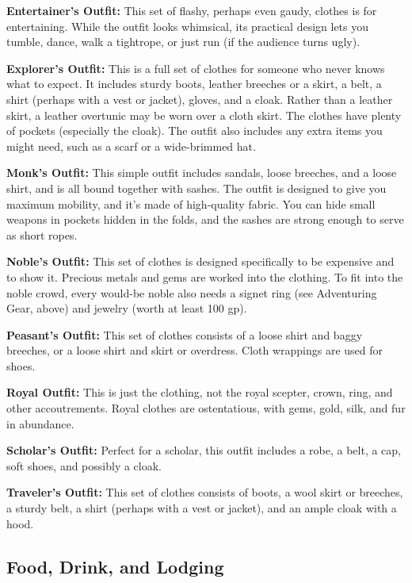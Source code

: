 \textbf{Entertainer's Outfit:} This set of flashy, perhaps even gaudy, clothes 
is for entertaining. While the outfit looks whimsical, its practical design lets 
you tumble, dance, walk a tightrope, or just run (if the audience turns ugly).

\textbf{Explorer's Outfit:} This is a full set of clothes for someone who never 
knows what to expect. It includes sturdy boots, leather breeches or a skirt, a 
belt, a shirt (perhaps with a vest or jacket), gloves, and a cloak. Rather than 
a leather skirt, a leather overtunic may be worn over a cloth skirt. The clothes 
have plenty of pockets (especially the cloak). The outfit also includes any extra 
items you might need, such as a scarf or a wide-brimmed hat.

\textbf{Monk's Outfit:} This simple outfit includes sandals, loose breeches, and 
a loose shirt, and is all bound together with sashes. The outfit is designed to 
give you maximum mobility, and it's made of high-quality fabric. You can hide small 
weapons in pockets hidden in the folds, and the sashes are strong enough to serve 
as short ropes.

\textbf{Noble's Outfit:} This set of clothes is designed specifically to be expensive 
and to show it. Precious metals and gems are worked into the clothing. To fit into 
the noble crowd, every would-be noble also needs a signet ring (see Adventuring 
Gear, above) and jewelry (worth at least 100 gp).

\textbf{Peasant's Outfit:} This set of clothes consists of a loose shirt and baggy 
breeches, or a loose shirt and skirt or overdress. Cloth wrappings are used for 
shoes.

\textbf{Royal Outfit:} This is just the clothing, not the royal scepter, crown, 
ring, and other accoutrements. Royal clothes are ostentatious, with gems, gold, 
silk, and fur in abundance.

\textbf{Scholar's Outfit:} Perfect for a scholar, this outfit includes a robe, 
a belt, a cap, soft shoes, and possibly a cloak.

\textbf{Traveler's Outfit:} This set of clothes consists of boots, a wool skirt 
or breeches, a sturdy belt, a shirt (perhaps with a vest or jacket), and an ample 
cloak with a hood.

\subsection{Food, Drink, and Lodging}

